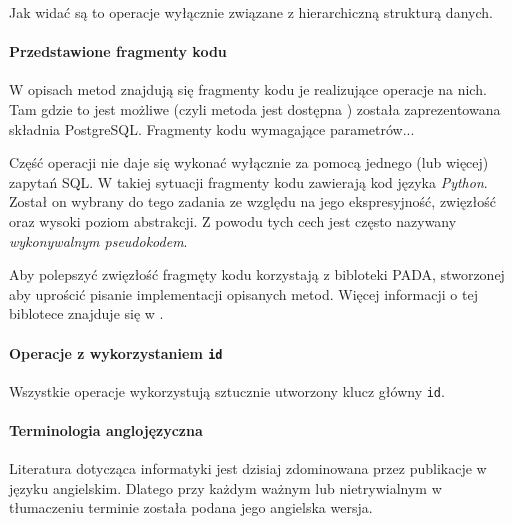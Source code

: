Jak widać są to operacje wyłącznie związane z hierarchiczną strukturą danych.





\paragraph{Przedstawione fragmenty kodu} 
W opisach metod znajdują się fragmenty kodu je realizujące operacje na nich. 
Tam gdzie to jest możliwe (czyli metoda jest dostępna ) została zaprezentowana składnia PostgreSQL.
Fragmenty kodu  wymagające parametrów...

Część operacji nie daje się wykonać wyłącznie za pomocą jednego (lub więcej) zapytań SQL.
W takiej sytuacji fragmenty kodu zawierają kod języka \emph{Python}.
Został on wybrany do tego zadania ze względu na jego ekspresyjność, zwięzłość oraz wysoki poziom abstrakcji.
Z powodu tych cech jest często nazywany \emph{wykonywalnym pseudokodem}.

Aby polepszyć zwięzłość fragmęty kodu korzystają z bibloteki PADA, stworzonej aby uprościć pisanie implementacji opisanych metod. 
Więcej informacji o tej biblotece znajduje się w .



\paragraph{Operacje z wykorzystaniem \texttt{id}}
Wszystkie operacje wykorzystują sztucznie utworzony klucz główny \texttt{id}. 



\paragraph{Terminologia anglojęzyczna} 
Literatura dotycząca informatyki jest dzisiaj zdominowana przez publikacje w języku angielskim. Dlatego przy każdym ważnym lub nietrywialnym w tłumaczeniu terminie została podana jego angielska wersja. 

